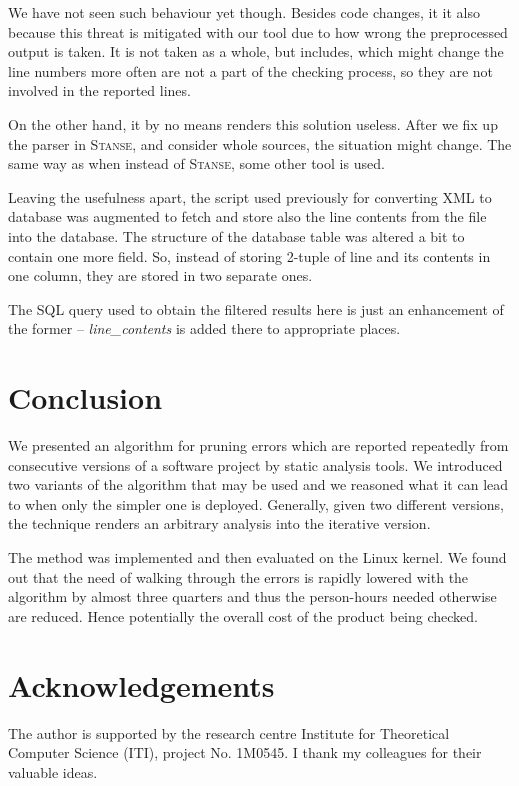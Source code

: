\documentclass{acm_proc_article-sp}
\newcommand\st{\textsc{Stanse}\xspace}
\begin{document}
We have not seen such behaviour yet though. Besides code changes, it it also
because this threat is mitigated with our tool due to how wrong the
preprocessed output is taken. It is not taken as a whole, but includes, which
might change the line numbers more often are not a part of the checking
process, so they are not involved in the reported lines.

On the other hand, it by no means renders this solution useless. After we fix
up the parser in \st, and consider whole sources, the situation might change.
The same way as when instead of \st, some other tool is used.

Leaving the usefulness apart, the script used previously for converting XML to
database was augmented to fetch and store also the line contents from the file
into the database. The structure of the database table was altered a bit to
contain one more field.  So, instead of storing 2-tuple of line and its
contents in one column, they are stored in two separate ones.

The SQL query used to obtain the filtered results here is just an enhancement
of the former -- \textit{line\_contents} is added there to appropriate places.

\newpage

\section{Conclusion}
We presented an algorithm for pruning errors which are reported repeatedly
from consecutive versions of a software project by static analysis tools. We
introduced two variants of the algorithm that may be used and we reasoned what
it can lead to when only the simpler one is deployed. Generally, given two
different versions, the technique renders an arbitrary analysis into the
iterative version.

The method was implemented and then evaluated on the Linux kernel. We found
out that the need of walking through the errors is rapidly lowered with the
algorithm by almost three quarters and thus the person-hours needed otherwise
are reduced. Hence potentially the overall cost of the product being checked.

\section*{Acknowledgements}
The author is supported by the research centre Institute for Theoretical
Computer Science (ITI), project No. 1M0545. I thank my colleagues for their
valuable ideas.



\end{document}
